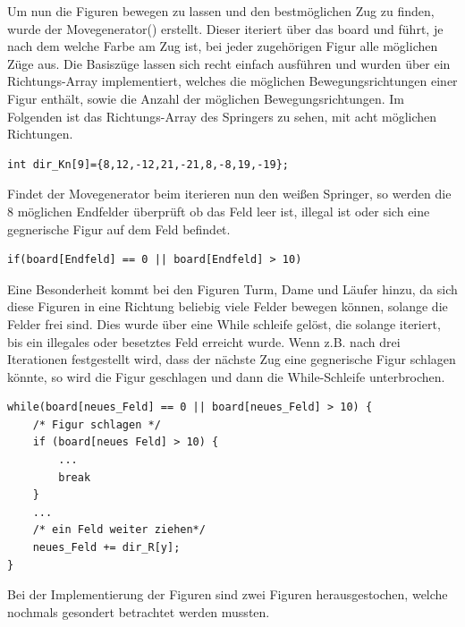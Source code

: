 \documentclass[a4paper, 12pt]{article}
\begin{document}
Um nun die Figuren bewegen zu lassen und den bestmöglichen Zug zu finden, wurde der Movegenerator() erstellt.
Dieser iteriert über das board und führt, je nach dem welche Farbe am Zug ist,  bei jeder zugehörigen Figur alle möglichen Züge aus.
Die Basiszüge lassen sich recht einfach ausführen und wurden über ein Richtungs-Array implementiert, welches die möglichen Bewegungsrichtungen einer Figur enthält, sowie die Anzahl der möglichen Bewegungsrichtungen.
Im Folgenden ist das Richtungs-Array des Springers zu sehen, mit acht möglichen Richtungen.

\begin{lstlisting}
int dir_Kn[9]={8,12,-12,21,-21,8,-8,19,-19};
\end{lstlisting}

Findet der Movegenerator beim iterieren nun den weißen Springer, so werden die 8 möglichen Endfelder überprüft ob das Feld leer ist, illegal ist oder sich eine gegnerische Figur auf dem Feld befindet.

\begin{lstlisting}
if(board[Endfeld] == 0 || board[Endfeld] > 10)
\end{lstlisting}

\newpage

Eine Besonderheit kommt bei den Figuren Turm, Dame und Läufer hinzu, da sich diese Figuren in eine Richtung beliebig viele Felder bewegen können, solange die Felder frei sind.
Dies wurde über eine While schleife gelöst, die solange iteriert, bis ein illegales oder besetztes Feld erreicht wurde.
Wenn z.B. nach drei Iterationen festgestellt wird, dass der nächste Zug eine gegnerische Figur schlagen könnte, so wird die Figur geschlagen und dann die While-Schleife unterbrochen.

\begin{lstlisting}
while(board[neues_Feld] == 0 || board[neues_Feld] > 10) {
    /* Figur schlagen */
    if (board[neues Feld] > 10) {
        ...
        break
    }
    ...
    /* ein Feld weiter ziehen*/
    neues_Feld += dir_R[y];
}
\end{lstlisting}

Bei der Implementierung der Figuren sind zwei Figuren herausgestochen, welche nochmals gesondert betrachtet werden mussten.\\
\end{document}
